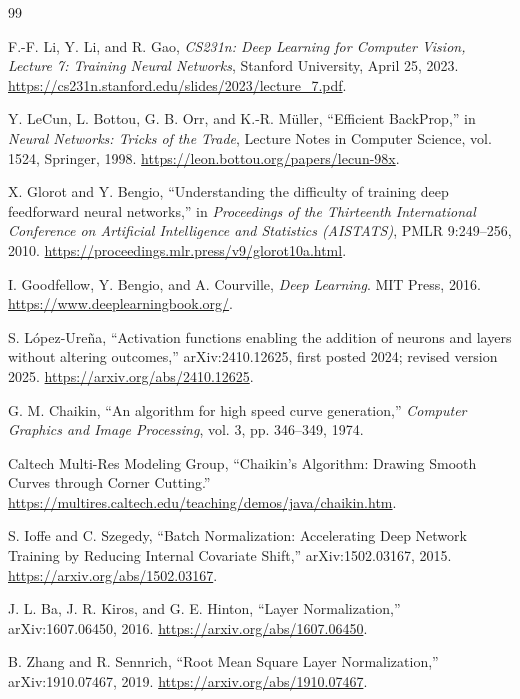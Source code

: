 \documentclass[11pt]{article}
\begin{document}
\begin{thebibliography}{99}

F.-F. Li, Y. Li, and R. Gao,
\emph{CS231n: Deep Learning for Computer Vision, Lecture 7: Training Neural Networks},
Stanford University, April 25, 2023.
\url{https://cs231n.stanford.edu/slides/2023/lecture_7.pdf}.

Y. LeCun, L. Bottou, G. B. Orr, and K.-R. M\"uller,
``Efficient BackProp,''
in \emph{Neural Networks: Tricks of the Trade},
Lecture Notes in Computer Science, vol. 1524, Springer, 1998.
\url{https://leon.bottou.org/papers/lecun-98x}.

X. Glorot and Y. Bengio,
``Understanding the difficulty of training deep feedforward neural networks,''
in \emph{Proceedings of the Thirteenth International Conference on Artificial Intelligence and Statistics (AISTATS)},
PMLR 9:249--256, 2010.
\url{https://proceedings.mlr.press/v9/glorot10a.html}.

I. Goodfellow, Y. Bengio, and A. Courville,
\emph{Deep Learning}.
MIT Press, 2016.
\url{https://www.deeplearningbook.org/}.

S. L\'opez-Ure\~na,
``Activation functions enabling the addition of neurons and layers without altering outcomes,''
arXiv:2410.12625, first posted 2024; revised version 2025.
\url{https://arxiv.org/abs/2410.12625}.

G. M. Chaikin,
``An algorithm for high speed curve generation,''
\emph{Computer Graphics and Image Processing}, vol. 3, pp. 346--349, 1974.

Caltech Multi-Res Modeling Group,
``Chaikin's Algorithm: Drawing Smooth Curves through Corner Cutting.''
\url{https://multires.caltech.edu/teaching/demos/java/chaikin.htm}.

S. Ioffe and C. Szegedy,
``Batch Normalization: Accelerating Deep Network Training by Reducing Internal Covariate Shift,''
arXiv:1502.03167, 2015.
\url{https://arxiv.org/abs/1502.03167}.

J. L. Ba, J. R. Kiros, and G. E. Hinton,
``Layer Normalization,''
arXiv:1607.06450, 2016.
\url{https://arxiv.org/abs/1607.06450}.

B. Zhang and R. Sennrich,
``Root Mean Square Layer Normalization,''
arXiv:1910.07467, 2019.
\url{https://arxiv.org/abs/1910.07467}.

\end{thebibliography}
\end{document}
